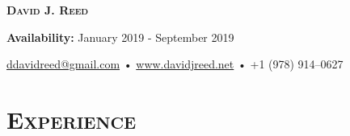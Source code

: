 \documentclass{article}
\begin{document}
\thispagestyle{empty}

\begin{center}
  {\LARGE\textsc{\textbf{David J. Reed}}}
\end{center}
\begin{center}
  \textbf{Availability:}
  January 2019 - September 2019
\end{center}
\begin{center}
  \href{mailto:ddavidreed@gmail.com}{ddavidreed@gmail.com} • \href{http://www.davidjreed.net/}{www.davidjreed.net} • +1 (978) 914--0627 \\
  \hrulefill
\end{center}


\section*{\textsc{Experience}}
\end{document}
